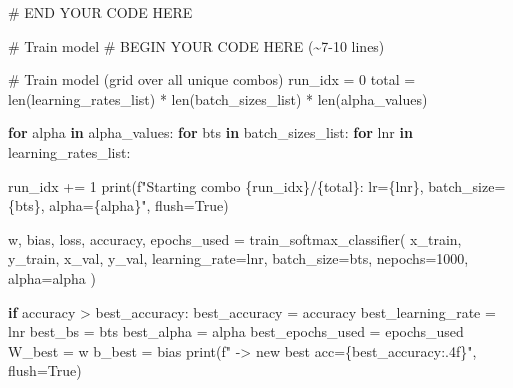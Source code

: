 \documentclass[
  letterpaper,
  DIV=11,
  numbers=noendperiod]{scrartcl}
\newenvironment{Shaded}{\begin{snugshade}}{\end{snugshade}}
\newcommand{\BuiltInTok}[1]{\textcolor[rgb]{0.00,0.23,0.31}{#1}}
\newcommand{\CommentTok}[1]{\textcolor[rgb]{0.37,0.37,0.37}{#1}}
\newcommand{\ControlFlowTok}[1]{\textcolor[rgb]{0.00,0.23,0.31}{\textbf{#1}}}
\newcommand{\DecValTok}[1]{\textcolor[rgb]{0.68,0.00,0.00}{#1}}
\newcommand{\KeywordTok}[1]{\textcolor[rgb]{0.00,0.23,0.31}{\textbf{#1}}}
\newcommand{\NormalTok}[1]{\textcolor[rgb]{0.00,0.23,0.31}{#1}}
\newcommand{\OperatorTok}[1]{\textcolor[rgb]{0.37,0.37,0.37}{#1}}
\newcommand{\RegionMarkerTok}[1]{\textcolor[rgb]{0.00,0.23,0.31}{#1}}
\newcommand{\SpecialCharTok}[1]{\textcolor[rgb]{0.37,0.37,0.37}{#1}}
\newcommand{\SpecialStringTok}[1]{\textcolor[rgb]{0.13,0.47,0.30}{#1}}
\newcommand{\VariableTok}[1]{\textcolor[rgb]{0.07,0.07,0.07}{#1}}
\begin{document}
\begin{Shaded}
\begin{Highlighting}[]
    \CommentTok{\# }\RegionMarkerTok{END}\CommentTok{ YOUR CODE HERE}

    \CommentTok{\# Train model}
    \CommentTok{\# }\RegionMarkerTok{BEGIN}\CommentTok{ YOUR CODE HERE (\textasciitilde{}7{-}10 lines)}

    \CommentTok{\# Train model (grid over all unique combos)}
\NormalTok{    run\_idx }\OperatorTok{=} \DecValTok{0}
\NormalTok{    total }\OperatorTok{=} \BuiltInTok{len}\NormalTok{(learning\_rates\_list) }\OperatorTok{*} \BuiltInTok{len}\NormalTok{(batch\_sizes\_list) }\OperatorTok{*} \BuiltInTok{len}\NormalTok{(alpha\_values)}
    
    \ControlFlowTok{for}\NormalTok{ alpha }\KeywordTok{in}\NormalTok{ alpha\_values:}
        \ControlFlowTok{for}\NormalTok{ bts }\KeywordTok{in}\NormalTok{ batch\_sizes\_list:}
            \ControlFlowTok{for}\NormalTok{ lnr }\KeywordTok{in}\NormalTok{ learning\_rates\_list:}

\NormalTok{                run\_idx }\OperatorTok{+=} \DecValTok{1}
                \BuiltInTok{print}\NormalTok{(}\SpecialStringTok{f"Starting combo }\SpecialCharTok{\{}\NormalTok{run\_idx}\SpecialCharTok{\}}\SpecialStringTok{/}\SpecialCharTok{\{}\NormalTok{total}\SpecialCharTok{\}}\SpecialStringTok{: lr=}\SpecialCharTok{\{}\NormalTok{lnr}\SpecialCharTok{\}}\SpecialStringTok{, batch\_size=}\SpecialCharTok{\{}\NormalTok{bts}\SpecialCharTok{\}}\SpecialStringTok{, alpha=}\SpecialCharTok{\{}\NormalTok{alpha}\SpecialCharTok{\}}\SpecialStringTok{"}\NormalTok{, flush}\OperatorTok{=}\VariableTok{True}\NormalTok{)}
                
\NormalTok{                w, bias, loss, accuracy, epochs\_used }\OperatorTok{=}\NormalTok{ train\_softmax\_classifier(}
\NormalTok{                    x\_train, y\_train, x\_val, y\_val,}
\NormalTok{                    learning\_rate}\OperatorTok{=}\NormalTok{lnr, batch\_size}\OperatorTok{=}\NormalTok{bts, nepochs}\OperatorTok{=}\DecValTok{1000}\NormalTok{, alpha}\OperatorTok{=}\NormalTok{alpha}
\NormalTok{                )}
                
                \ControlFlowTok{if}\NormalTok{ accuracy }\OperatorTok{\textgreater{}}\NormalTok{ best\_accuracy:}
\NormalTok{                    best\_accuracy }\OperatorTok{=}\NormalTok{ accuracy}
\NormalTok{                    best\_learning\_rate }\OperatorTok{=}\NormalTok{ lnr}
\NormalTok{                    best\_bs }\OperatorTok{=}\NormalTok{ bts}
\NormalTok{                    best\_alpha }\OperatorTok{=}\NormalTok{ alpha}
\NormalTok{                    best\_epochs\_used }\OperatorTok{=}\NormalTok{ epochs\_used}
\NormalTok{                    W\_best }\OperatorTok{=}\NormalTok{ w}
\NormalTok{                    b\_best }\OperatorTok{=}\NormalTok{ bias}
                    \BuiltInTok{print}\NormalTok{(}\SpecialStringTok{f" {-}\textgreater{} new best acc=}\SpecialCharTok{\{}\NormalTok{best\_accuracy}\SpecialCharTok{:.4f\}}\SpecialStringTok{"}\NormalTok{, flush}\OperatorTok{=}\VariableTok{True}\NormalTok{)}
                    

\end{Highlighting}
\end{Shaded}
\end{document}

